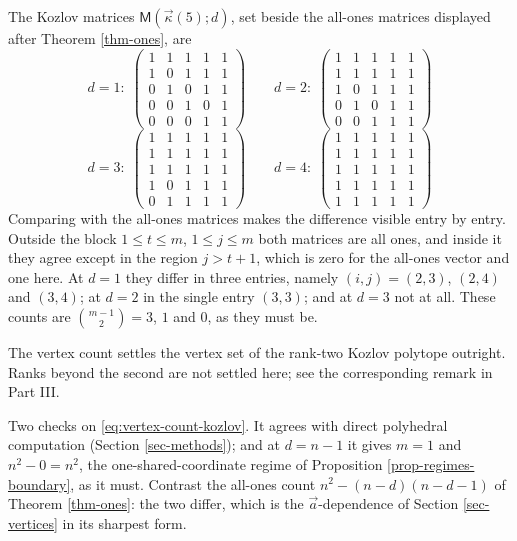 \documentclass[11pt, a4paper, abstract=yes]{scrartcl}
\theoremstyle{definition}
\theoremstyle{remark}
\theoremstyle{plain}
\newcommand{\kozvec}{\vec\kappa}
\newcommand{\extten}{\mathsf{M}}
\begin{document}
The Kozlov matrices \(\extten(\kozvec(5);d)\), set beside the all-ones matrices
displayed after Theorem \ref{thm-ones}, are
\[
d=1:\;\begin{pmatrix}1&1&1&1&1\\1&0&1&1&1\\0&1&0&1&1\\0&0&1&0&1\\0&0&0&1&1\end{pmatrix} \qquad d=2:\;\begin{pmatrix}1&1&1&1&1\\1&1&1&1&1\\1&0&1&1&1\\0&1&0&1&1\\0&0&1&1&1\end{pmatrix}
\]
\[
d=3:\;\begin{pmatrix}1&1&1&1&1\\1&1&1&1&1\\1&1&1&1&1\\1&0&1&1&1\\0&1&1&1&1\end{pmatrix} \qquad d=4:\;\begin{pmatrix}1&1&1&1&1\\1&1&1&1&1\\1&1&1&1&1\\1&1&1&1&1\\1&1&1&1&1\end{pmatrix}
\]
Comparing with the all-ones matrices makes the difference visible entry by entry. Outside the block
\(1\le t\le m\), \(1\le j\le m\) both matrices are all ones, and inside it they agree except in the
region \(j>t+1\), which is zero for the all-ones vector and one here. At \(d=1\) they
differ in three entries, namely \((i,j)=(2,3)\), \((2,4)\) and \((3,4)\); at \(d=2\) in the single
entry \((3,3)\); and at \(d=3\) not at all. These counts are \(\binom{m-1}{2}=3\), \(1\) and \(0\),
as they must be.

The vertex count settles the vertex set of the rank-two Kozlov polytope outright. Ranks beyond the
second are not settled here; see the corresponding remark in Part III.

Two checks on \eqref{eq:vertex-count-kozlov}. It agrees with direct polyhedral computation
(Section \ref{sec-methods}); and at \(d=n-1\) it gives \(m=1\) and \(n^2-0=n^2\), the
one-shared-coordinate regime of Proposition \ref{prop-regimes-boundary}, as it must. Contrast the
all-ones count \(n^2-(n-d)(n-d-1)\) of Theorem \ref{thm-ones}: the two differ, which is the
\(\vec a\)-dependence of Section \ref{sec-vertices} in its sharpest form.
\end{document}

